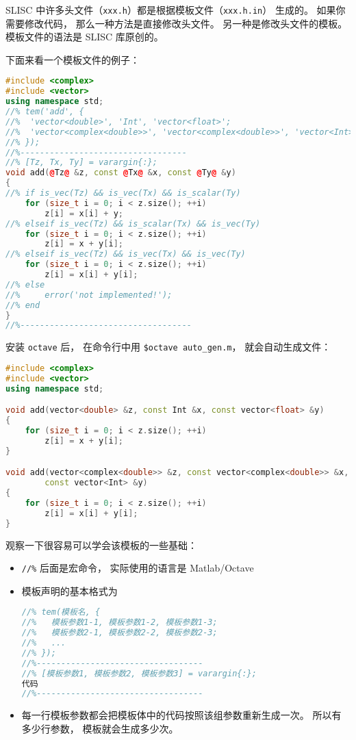 
\begin{issues}
\issueDraft
\end{issues}


SLISC 中许多头文件（\verb`xxx.h`）都是根据模板文件（\verb`xxx.h.in`） 生成的。 如果你需要修改代码， 那么一种方法是直接修改头文件。 另一种是修改头文件的模板。 模板文件的语法是 SLISC 库原创的。

下面来看一个模板文件的例子：
\begin{lstlisting}[language=cpp, caption=demo.h.in]
#include <complex>
#include <vector>
using namespace std;
//% tem('add', {
//%  'vector<double>', 'Int', 'vector<float>';
//%  'vector<complex<double>>', 'vector<complex<double>>', 'vector<Int>';
//% });
//%----------------------------------
//% [Tz, Tx, Ty] = varargin{:};
void add(@Tz@ &z, const @Tx@ &x, const @Ty@ &y)
{
//% if is_vec(Tz) && is_vec(Tx) && is_scalar(Ty)
	for (size_t i = 0; i < z.size(); ++i)
		z[i] = x[i] + y;
//% elseif is_vec(Tz) && is_scalar(Tx) && is_vec(Ty)
	for (size_t i = 0; i < z.size(); ++i)
		z[i] = x + y[i];
//% elseif is_vec(Tz) && is_vec(Tx) && is_vec(Ty)
	for (size_t i = 0; i < z.size(); ++i)
		z[i] = x[i] + y[i];
//% else
//%     error('not implemented!');
//% end
}
//%-----------------------------------
\end{lstlisting}

安装 \verb`octave` 后， 在命令行中用 \verb`$octave auto_gen.m`， 就会自动生成文件：
\begin{lstlisting}[language=cpp,caption=demo.h]
#include <complex>
#include <vector>
using namespace std;

void add(vector<double> &z, const Int &x, const vector<float> &y)
{
	for (size_t i = 0; i < z.size(); ++i)
		z[i] = x + y[i];
}

void add(vector<complex<double>> &z, const vector<complex<double>> &x,
        const vector<Int> &y)
{
	for (size_t i = 0; i < z.size(); ++i)
		z[i] = x[i] + y[i];
}
\end{lstlisting}

观察一下很容易可以学会该模板的一些基础：
\begin{itemize}
\item \verb`//%` 后面是宏命令， 实际使用的语言是 Matlab/Octave
\item 模板声明的基本格式为
\begin{lstlisting}[language=cpp]
//% tem(模板名, {
//%   模板参数1-1, 模板参数1-2, 模板参数1-3;
//%   模板参数2-1, 模板参数2-2, 模板参数2-3;
//%   ...
//% });
//%----------------------------------
//% [模板参数1, 模板参数2, 模板参数3] = varargin{:};
代码
//%----------------------------------
\end{lstlisting}
\item 每一行模板参数都会把模板体中的代码按照该组参数重新生成一次。 所以有多少行参数， 模板就会生成多少次。
\end{itemize}
